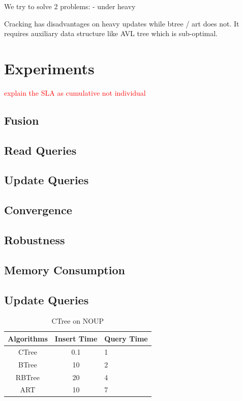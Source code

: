 \documentclass{sig-alternate}
\newcommand\todo[1]{\textcolor{red}{#1}}
\begin{document}
We try to solve 2 problems:
- under heavy 

Cracking has disadvantages on heavy updates while btree / art does not.
It requires auxiliary data structure like AVL tree which is sub-optimal.

\section{Experiments}

\todo{explain the SLA as cumulative not individual}

\subsection{Fusion}
\subsection{Read Queries}
\subsection{Update Queries}
\subsection{Convergence}
\subsection{Robustness}
\subsection{Memory Consumption}
\subsection{Update Queries}


\begin{table}
\centering
\caption{CTree on NOUP}
\begin{tabular}{|c|c|l|} \hline
\textbf{Algorithms} & \textbf{Insert Time} & \textbf{Query Time}\\ \hline
CTree & 0.1 & 1 \\ \hline
BTree & 10 & 2 \\ \hline
RBTree & 20 & 4 \\ \hline
ART & 10 & 7 \\ \hline
\hline\end{tabular}
\end{table}
\end{document}
